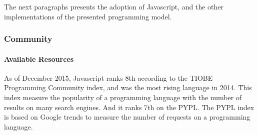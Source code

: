 
The next paragraphs presents the adoption of Javascript, and the other implementations of the presented programming model.


\subsubsection{Community}

\paragraph{Available Resources}

As of December 2015, Javascript ranks 8th according to the TIOBE Programming Community index, and was the most rising language in 2014.
This index measure the popularity of a programming language with the number of results on many search engines.
And it ranks 7th on the PYPL.
The PYPL index is based on Google trends to measure the number of requests on a programming language.

